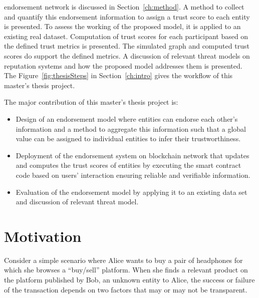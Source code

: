 endorsement network is discussed in Section~\ref{ch:method}. A method to
collect and quantify this endorsement information to assign a trust score to
each entity is presented. To assess the working of the proposed model, it is
applied to an existing real dataset. Computation of trust scores for each
participant based on the defined trust metrics is presented. The simulated
graph and computed trust scores do support the defined metrics. A discussion of
relevant threat models on reputation systems and how the proposed model
addresses them is presented. The Figure~\ref{fig:thesisSteps} in
Section~\ref{ch:intro} gives the workflow of this master’s thesis project. \par
The major contribution of this master's thesis project is:
\begin{itemize}
	\item Design of an endorsement model where entities can endorse each
		other's information and a method to aggregate this information such
		that a global value can be assigned to individual entities to infer
		their trustworthiness. 
	\item Deployment of the endorsement system on blockchain network that
		updates and computes the trust scores of entities by executing the
		smart contract code based on users' interaction ensuring reliable and
		verifiable information. 
	\item Evaluation of the endorsement model by applying it to an existing
		data set and discussion of relevant threat model.
\end{itemize}


 
\section{Motivation}
Consider a simple scenario where Alice wants to buy a pair of headphones for
which she browses a ``buy/sell'' platform. When she finds a relevant product on
the platform published by Bob, an unknown entity to Alice, the success or
failure of the transaction depends on two factors that may or may not be
transparent.
